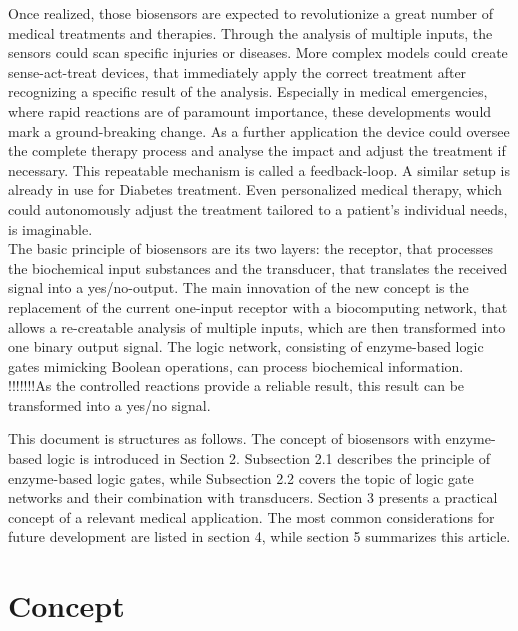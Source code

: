 \documentclass[runningheads]{llncs}
\begin{document}
	Once realized, those biosensors are expected to revolutionize a great number of medical treatments and therapies. Through the analysis of multiple inputs, the sensors could scan specific injuries or diseases. More complex models could create sense-act-treat devices, that immediately apply the correct treatment after recognizing a specific result of the analysis. Especially in medical emergencies, where rapid reactions are of paramount importance, these developments would mark a ground-breaking change. As a further application the device could oversee the complete therapy process and analyse the impact and adjust the treatment if necessary. This repeatable mechanism is called a feedback-loop. A similar setup is already in use for Diabetes treatment. Even personalized medical therapy, which could autonomously adjust the treatment tailored to a patient’s individual needs, is imaginable.\cite{original}\\
	
	The basic principle of biosensors are its two layers: the receptor, that processes the biochemical input substances and the transducer, that translates the received signal into a yes/no-output. The main innovation of the new concept is the replacement of the current one-input receptor with a biocomputing network, that allows a re-creatable analysis of multiple inputs, which are then transformed into one binary output signal. The logic network, consisting of enzyme-based logic gates mimicking Boolean operations, can process biochemical information.\cite{state of the art}\\ 
	 
	!!!!!!!As the controlled reactions provide a reliable result, this result can be transformed into a yes/no signal.
	
	This document is structures as follows. The concept of biosensors with enzyme-based logic is introduced in Section 2. Subsection 2.1 describes the principle of enzyme-based logic gates, while Subsection 2.2 covers the topic of logic gate networks and their combination with transducers. Section 3 presents a practical concept of a relevant medical application. The most common considerations for future development are listed in section 4, while section 5 summarizes this article.
	
	
	
	
	
\section{Concept}
\end{document}
